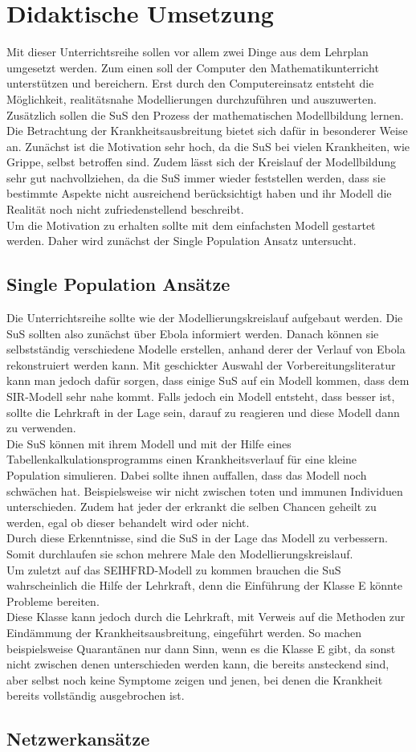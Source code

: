 \section{Didaktische Umsetzung}
\ellen
Mit dieser Unterrichtsreihe sollen vor allem zwei Dinge aus dem Lehrplan umgesetzt werden. Zum einen soll der Computer den Mathematikunterricht unterstützen und bereichern. Erst durch den Computereinsatz entsteht die Möglichkeit, realitätsnahe Modellierungen durchzuführen und auszuwerten. \\
Zusätzlich sollen die SuS den Prozess der mathematischen Modellbildung lernen. Die Betrachtung der Krankheitsausbreitung bietet sich dafür in besonderer Weise an. Zunächst ist die Motivation sehr hoch, da die SuS bei vielen Krankheiten, wie Grippe, selbst betroffen sind. Zudem lässt sich der Kreislauf der Modellbildung sehr gut nachvollziehen, da die SuS immer wieder feststellen werden, dass sie bestimmte Aspekte nicht ausreichend berücksichtigt haben und ihr Modell die Realität noch nicht zufriedenstellend beschreibt.\\
Um die Motivation zu erhalten sollte mit dem einfachsten Modell gestartet werden. Daher wird zunächst der Single Population Ansatz untersucht.
\subsection{Single Population Ansätze}
\ellen
Die Unterrichtsreihe sollte wie der Modellierungskreislauf aufgebaut werden. Die SuS sollten also zunächst über Ebola informiert werden. Danach können sie selbstständig verschiedene Modelle erstellen, anhand derer der Verlauf von Ebola rekonstruiert werden kann. Mit geschickter Auswahl der Vorbereitungsliteratur kann man jedoch dafür sorgen, dass einige SuS auf ein Modell kommen, dass dem SIR-Modell sehr nahe kommt. Falls jedoch ein Modell entsteht, dass besser ist, sollte die Lehrkraft in der Lage sein, darauf zu reagieren und diese Modell dann zu verwenden.\\
Die SuS können mit ihrem Modell und mit der Hilfe eines Tabellenkalkulationsprogramms einen Krankheitsverlauf für eine kleine Population simulieren. Dabei sollte ihnen auffallen, dass das Modell noch schwächen hat. Beispielsweise wir nicht zwischen toten und immunen Individuen unterschieden. Zudem hat jeder der erkrankt die selben Chancen geheilt zu werden, egal ob dieser behandelt wird oder nicht.\\
 Durch diese Erkenntnisse, sind die SuS in der Lage das Modell zu verbessern. Somit durchlaufen sie schon mehrere Male den Modellierungskreislauf.\\
 Um zuletzt auf das SEIHFRD-Modell zu kommen brauchen die SuS wahrscheinlich die Hilfe der Lehrkraft, denn die Einführung der Klasse \glqq E\grqq{} könnte Probleme bereiten.\\
 Diese Klasse kann jedoch durch die Lehrkraft, mit Verweis auf die Methoden zur Eindämmung der Krankheitsausbreitung, eingeführt werden. So machen beispielsweise Quarantänen nur dann Sinn, wenn es die Klasse \glqq E\grqq{} gibt, da sonst nicht zwischen denen unterschieden werden kann, die bereits ansteckend sind, aber selbst noch keine Symptome zeigen und jenen, bei denen die Krankheit bereits vollständig ausgebrochen ist.  
\subsection{Netzwerkansätze}